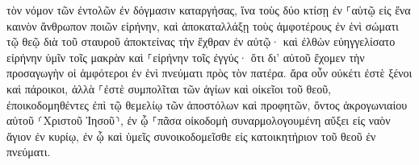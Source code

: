 \documentclass{openreader}
\begin{document}
τὸν νόμον τῶν ἐντολῶν ἐν δόγμασιν καταργήσας, ἵνα τοὺς δύο κτίσῃ ἐν ⸀αὑτῷ εἰς ἕνα καινὸν ἄνθρωπον ποιῶν εἰρήνην, 
καὶ ἀποκαταλλάξῃ τοὺς ἀμφοτέρους ἐν ἑνὶ σώματι τῷ θεῷ διὰ τοῦ σταυροῦ ἀποκτείνας τὴν ἔχθραν ἐν αὐτῷ· 
καὶ ἐλθὼν εὐηγγελίσατο εἰρήνην ὑμῖν τοῖς μακρὰν καὶ ⸀εἰρήνην τοῖς ἐγγύς· 
ὅτι δι’ αὐτοῦ ἔχομεν τὴν προσαγωγὴν οἱ ἀμφότεροι ἐν ἑνὶ πνεύματι πρὸς τὸν πατέρα. 
ἄρα οὖν οὐκέτι ἐστὲ ξένοι καὶ πάροικοι, ἀλλὰ ⸀ἐστὲ συμπολῖται τῶν ἁγίων καὶ οἰκεῖοι τοῦ θεοῦ, 
ἐποικοδομηθέντες ἐπὶ τῷ θεμελίῳ τῶν ἀποστόλων καὶ προφητῶν, ὄντος ἀκρογωνιαίου αὐτοῦ ⸂Χριστοῦ Ἰησοῦ⸃, 
ἐν ᾧ ⸀πᾶσα οἰκοδομὴ συναρμολογουμένη αὔξει εἰς ναὸν ἅγιον ἐν κυρίῳ, 
ἐν ᾧ καὶ ὑμεῖς συνοικοδομεῖσθε εἰς κατοικητήριον τοῦ θεοῦ ἐν πνεύματι. 
\end{document}

